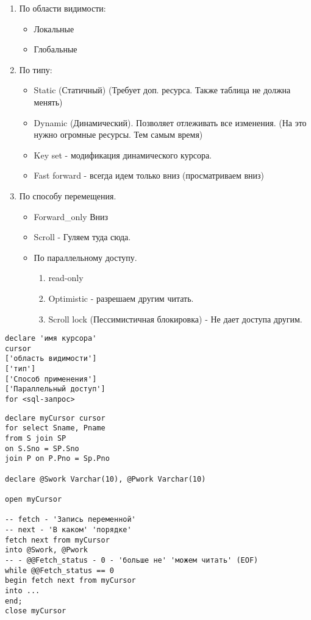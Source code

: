 \begin{enumerate}
	\item По области видимости:
	      \begin{itemize}
		      \item Локальные
		      \item Глобальные
	      \end{itemize}
	\item По типу:
	      \begin{itemize}
		      \item Static (Статичный) (Требует доп. ресурса. Также таблица не должна менять)
		      \item Dynamic (Динамический). Позволяет отлеживать все изменения. (На это нужно огромные ресурсы. Тем самым время)
		      \item Key set - модификация динамического курсора.
		      \item Fast forward - всегда идем только вниз (просматриваем вниз)
	      \end{itemize}
	\item По способу перемещения.
	      \begin{itemize}
		      \item Forward\_only Вниз
		      \item Scroll - Гуляем туда сюда.
		      \item По параллельному доступу.
		            \begin{enumerate}
			            \item read-only
			            \item Optimistic - разрешаем другим читать.
			            \item Scroll lock (Пессимистичная блокировка) - Не дает доступа другим.
		            \end{enumerate}

	      \end{itemize}
\end{enumerate}

\begin{lstlisting}[label=some-code,caption=Курсор]
declare 'имя курсора'
cursor 
['область видимости']
['тип']
['Способ применения']
['Параллельный доступ']
for <sql-запрос>
\end{lstlisting}

\begin{lstlisting}[label=some-code,caption=Курсор. Пример]
declare myCursor cursor
for select Sname, Pname
from S join SP
on S.Sno = SP.Sno
join P on P.Pno = Sp.Pno

declare @Swork Varchar(10), @Pwork Varchar(10)

open myCursor

-- fetch - 'Запись переменной'
-- next - 'В каком' 'порядке'
fetch next from myCursor 
into @Swork, @Pwork
-- - @@Fetch_status - 0 - 'больше не' 'можем читать' (EOF)
while @@Fetch_status == 0
begin fetch next from myCursor
into ...
end;
close myCursor
\end{lstlisting}

